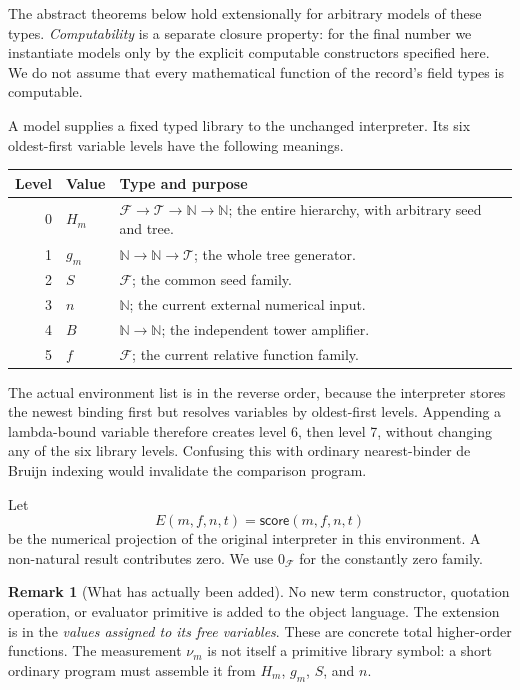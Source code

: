 \documentclass[11pt,letterpaper]{article}
\theoremstyle{definition}
\newtheorem{remark}[theorem]{Remark}
\newcommand{\N}{\mathbb N}
\newcommand{\Tree}{\mathcal T}
\newcommand{\Fam}{\mathcal F}
\newcommand{\score}{\mathsf{score}}
\begin{document}
The abstract theorems below hold extensionally for arbitrary models of these
types. \emph{Computability} is a separate closure property: for the final
number we instantiate models only by the explicit computable constructors
specified here. We do not assume that every mathematical function of the
record's field types is computable.

A model supplies a fixed typed library to the unchanged interpreter. Its six
oldest-first variable levels have the following meanings.

\begin{center}
\begin{tabularx}{\linewidth}{@{}r l X@{}}
\toprule
Level & Value & Type and purpose\\
\midrule
0 & $H_m$ & $\Fam\to\Tree\to\N\to\N$; the entire hierarchy, with arbitrary seed and tree.\\
1 & $g_m$ & $\N\to\N\to\Tree$; the whole tree generator.\\
2 & $S$ & $\Fam$; the common seed family.\\
3 & $n$ & $\N$; the current external numerical input.\\
4 & $B$ & $\N\to\N$; the independent tower amplifier.\\
5 & $f$ & $\Fam$; the current relative function family.\\
\bottomrule
\end{tabularx}
\end{center}

The actual environment list is in the reverse order, because the interpreter
stores the newest binding first but resolves variables by oldest-first levels.
Appending a lambda-bound variable therefore creates level 6, then level 7,
without changing any of the six library levels. Confusing this with ordinary
nearest-binder de Bruijn indexing would invalidate the comparison program.

Let
\[
 E(m,f,n,t)=\score(m,f,n,t)
\]
be the numerical projection of the original interpreter in this environment.
A non-natural result contributes zero. We use $0_{\Fam}$ for the constantly
zero family.

\begin{remark}[What has actually been added]
No new term constructor, quotation operation, or evaluator primitive is added
to the object language. The extension is in the \emph{values assigned to its
free variables}. These are concrete total higher-order functions. The
measurement $\nu_m$ is not itself a primitive library symbol: a short ordinary
program must assemble it from $H_m$, $g_m$, $S$, and $n$.
\end{remark}
\end{document}
